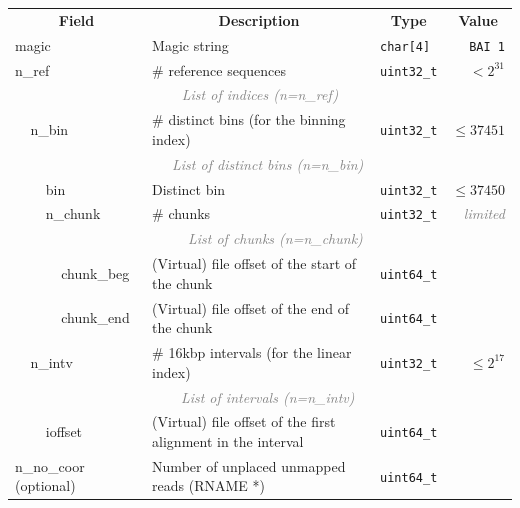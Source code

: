 \documentclass[10pt]{article}
\newcommand*{\memlimited}{\textcolor{gray}{\footnotesize\it limited}}
\begin{document}
\begin{table}[ht]
\centering\small
\begin{tabular}{|l|l|l|l|l|l|r|}
  \cline{1-7}
  \multicolumn{4}{|c|}{\bf Field} & \multicolumn{1}{c|}{\bf Description} & \multicolumn{1}{c|}{\bf Type} & \multicolumn{1}{c|}{\bf Value} \\\cline{1-7}
  \multicolumn{4}{|l|}{\sf magic} & Magic string & {\tt char[4]} & {\tt BAI\char92 1}\\\cline{1-7}
  \multicolumn{4}{|l|}{\sf n\_ref} & \# reference sequences & {\tt uint32\_t} & $< 2^{31}$ \\\cline{1-7}
  \multicolumn{7}{|c|}{\textcolor{gray}{\it List of indices (n=n\_ref)}} \\\cline{2-7}
  & \multicolumn{3}{l|}{\sf n\_bin} & \# distinct bins (for the binning index) & {\tt uint32\_t} & $\le 37451$ \\\cline{2-7}
  & \multicolumn{6}{c|}{\textcolor{gray}{\it List of distinct bins (n=n\_bin)}} \\\cline{3-7}
  & & \multicolumn{2}{l|}{\sf bin} & Distinct bin & {\tt uint32\_t} & $\le 37450$ \\\cline{3-7}
  & & \multicolumn{2}{l|}{\sf n\_chunk} & \# chunks & {\tt uint32\_t} & \memlimited\footnotemark \\\cline{3-7}
  & & \multicolumn{5}{c|}{\textcolor{gray}{\it List of chunks (n=n\_chunk)}} \\\cline{4-7}
  & & & {\sf chunk\_beg} & (Virtual) file offset of the start of the chunk & {\tt uint64\_t} & \\\cline{4-7}
  & & & {\sf chunk\_end} & (Virtual) file offset of the end of the chunk & {\tt uint64\_t} & \\\cline{2-7}
  & \multicolumn{3}{l|}{\sf n\_intv} & \# 16kbp intervals (for the linear index) & {\tt uint32\_t} & $\le 2^{17}$ \\\cline{2-7}
  & \multicolumn{6}{c|}{\textcolor{gray}{\it List of intervals (n=n\_intv)}} \\\cline{3-7}
  & & \multicolumn{2}{l|}{\sf ioffset} & (Virtual) file offset of the first alignment in the interval & {\tt uint64\_t} & \\\cline{1-7}
  \multicolumn{4}{|l|}{{\sf n\_no\_coor} (optional)} & Number of unplaced unmapped reads ({\sf RNAME} *) & {\tt uint64\_t} & \\\cline{1-7}
\end{tabular}
\end{table}

\end{document}
